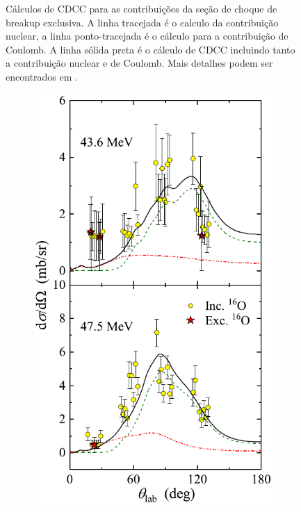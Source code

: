 \documentclass[a4paper,12pt,oneside]{book}
\begin{document}
\begin{figure}[H]
\begin{subfigure}[t]{0.45\textwidth}
        \caption{}
        \label{subfig:dist_ang_2_cdcc_b}
    \end{subfigure}
\caption{Cálculos de CDCC para as contribuições da seção de choque de breakup exclusiva. A linha tracejada é o calculo da contribuição nuclear, a linha ponto-tracejada é o cálculo para a contribuição de Coulomb. A linha sólida preta é o cálculo de CDCC incluindo tanto a contribuição nuclear e de Coulomb. Mais detalhes podem ser encontrados em \cite{MORO_BREAKUP}.}
\label{fig:dist_ang_2_cdcc}
\end{figure}

\begin{figure}[H]
\centering
    \begin{subfigure}[t]{0.45\textwidth}
        \centering
        \includegraphics[scale=0.5, width=.97\columnwidth]{figs/17F_58Ni_near_barrier_a.png}

\end{subfigure}
\end{figure}
\end{document}
